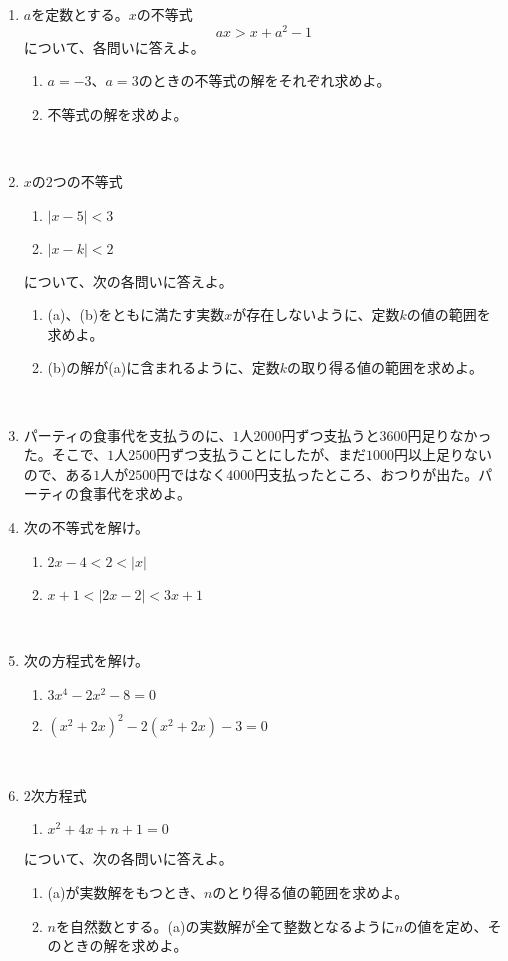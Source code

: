 \documentclass[10pt,a4paper,fleqn]{jsarticle}
\begin{document}
\begin{enumerate}
\item $a$を定数とする。$x$の不等式 \[ax>x+a^2-1 \]について、各問いに答えよ。
\begin{enumerate}[(1)]
\item $a=-3$、$a=3$のときの不等式の解をそれぞれ求めよ。
\item 不等式の解を求めよ。 
\end{enumerate}\

\item $x$の$2$つの不等式 
\begin{enumerate}
\item $|x-5|<3$
\item $|x-k|<2$ 
\end{enumerate}
\begin{flushleft}
について、次の各問いに答えよ。
\end{flushleft}
\begin{enumerate}[(1)]
\item (a)、(b)をともに満たす実数$x$が存在しないように、定数$k$の値の範囲を求めよ。
\item (b)の解が(a)に含まれるように、定数$k$の取り得る値の範囲を求めよ。
\end{enumerate}\

\item パーティの食事代を支払うのに、$1$人$2000$円ずつ支払うと$3600$円足りなかった。そこで、$1$人$2500$円ずつ支払うことにしたが、まだ$1000$円以上足りないので、ある$1$人が$2500$円ではなく$4000$円支払ったところ、おつりが出た。パーティの食事代を求めよ。\newline

\item 次の不等式を解け。
\begin{enumerate}[(1)]
\item $2x-4<2<|x|$ 
\item $x+1<|2x-2|<3x+1$ 
\end{enumerate}\

\item 次の方程式を解け。
\begin{enumerate}[(1)]
\item $3x^4-2x^2-8=0$ 
\item $(x^2+2x)^2-2(x^2+2x)-3=0$ 
\end{enumerate}\

\item $2$次方程式 
\begin{enumerate}
\item $x^2+4x+n+1=0$
\end{enumerate}
\begin{flushleft}
について、次の各問いに答えよ。
\end{flushleft}
\begin{enumerate}[(1)]
\item (a)が実数解をもつとき、$n$のとり得る値の範囲を求めよ。
\item $n$を自然数とする。(a)の実数解が全て整数となるように$n$の値を定め、そのときの解を求めよ。
\end{enumerate}\


\end{enumerate}
\end{document}
